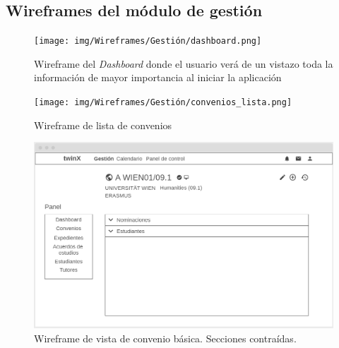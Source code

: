 \subsection{Wireframes del módulo de gestión}

\begin{figure}
	\centering
	\texttt{[image: img/Wireframes/Gestión/dashboard.png]}
	\caption[Wireframe de \textit{Dashboard}]{Wireframe del \textit{Dashboard} donde el usuario verá de un vistazo toda la información de mayor importancia al iniciar la aplicación}
	\label{fig:dashboardWF}
\end{figure}

\begin{figure}
	\centering
	\texttt{[image: img/Wireframes/Gestión/convenios\_lista.png]}
	\caption{Wireframe de lista de convenios}
	\label{fig:convenios_listaWF}
\end{figure}

\begin{figure}
\centering
\includegraphics[width=\textwidth]{img/Wireframes/Gestión/vista_convenio_básica_contraída.png}
\caption[Wireframe de vista de convenio básica]{Wireframe de vista de convenio básica. Secciones contraídas.}
\label{fig:vista_conv_básica_contWF}
\end{figure}

